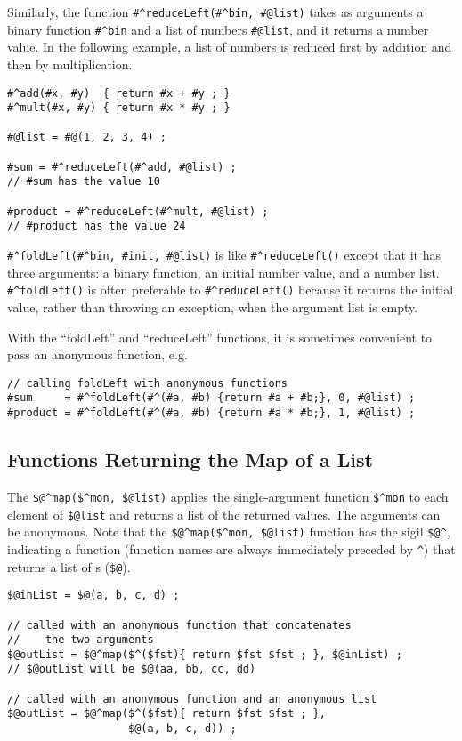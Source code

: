 Similarly, the function 
\verb!#^reduceLeft(#^bin, #@list)! 
takes as arguments 
a binary function \verb!#^bin! and
a list of numbers \verb!#@list!,
and it returns a number value.  In
the following example, a list of numbers is reduced first by addition and then by
multiplication.

\begin{Verbatim}
#^add(#x, #y)  { return #x + #y ; }
#^mult(#x, #y) { return #x * #y ; }

#@list = #@(1, 2, 3, 4) ;

#sum = #^reduceLeft(#^add, #@list) ;
// #sum has the value 10

#product = #^reduceLeft(#^mult, #@list) ;
// #product has the value 24
\end{Verbatim}

\verb!#^foldLeft(#^bin, #init, #@list)! is like \verb!#^reduceLeft()! except that it
has three arguments: a binary function, an initial number value, and a number list.
\verb!#^foldLeft()! is often preferable to \verb!#^reduceLeft()! because
it returns the initial value, rather than throwing an exception, when
the argument list is empty.

With the ``foldLeft'' and ``reduceLeft'' functions, it is sometimes convenient to pass an
anonymous function, e.g.

\begin{Verbatim}
// calling foldLeft with anonymous functions
#sum     = #^foldLeft(#^(#a, #b) {return #a + #b;}, 0, #@list) ;
#product = #^foldLeft(#^(#a, #b) {return #a * #b;}, 1, #@list) ;
\end{Verbatim}


\subsection{Functions Returning the Map of a List}

The \verb!$@^map($^mon, $@list)!
applies the single-argument function \verb!$^mon! to each \fsm{} element of
\verb!$@list! and returns a list of the returned \fsm{} values.  The arguments
can be anonymous.  Note that the \verb!$@^map($^mon, $@list)! function has the sigil
\verb!$@^!, indicating a function (function names are always immediately preceded by \verb!^!) that returns a list of \fsm{}s (\verb!$@!).

\begin{Verbatim}
$@inList = $@(a, b, c, d) ;

// called with an anonymous function that concatenates
//    the two arguments
$@outList = $@^map($^($fst){ return $fst $fst ; }, $@inList) ;
// $@outList will be $@(aa, bb, cc, dd)

// called with an anonymous function and an anonymous list
$@outList = $@^map($^($fst){ return $fst $fst ; }, 
                   $@(a, b, c, d)) ;
\end{Verbatim}

